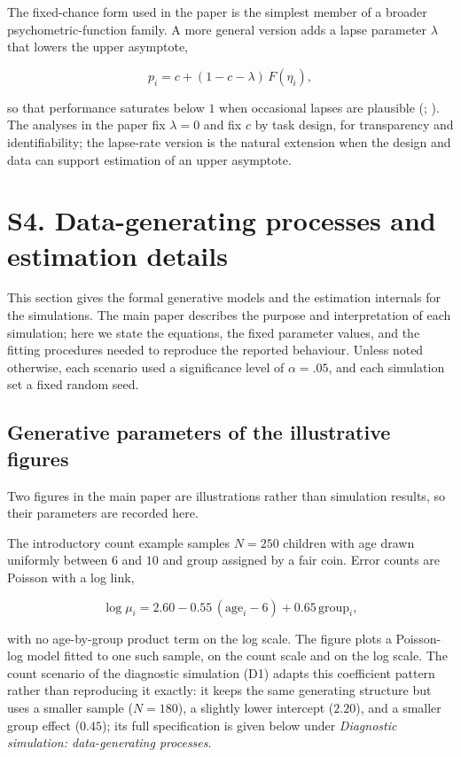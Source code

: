 \documentclass[
  man,
  floatsintext,
  longtable,
  nolmodern,
  notxfonts,
  notimes,
  colorlinks=true,linkcolor=blue,citecolor=blue,urlcolor=blue]{apa7}
\begin{document}
The fixed-chance form used in the paper is the simplest member of a
broader psychometric-function family. A more general version adds a
lapse parameter \(\lambda\) that lowers the upper asymptote,

\[
p_i = c + (1 - c - \lambda)\,F(\eta_i),
\]

so that performance saturates below \(1\) when occasional lapses are
plausible (;
). The analyses in
the paper fix \(\lambda = 0\) and fix \(c\) by task design, for
transparency and identifiability; the lapse-rate version is the natural
extension when the design and data can support estimation of an upper
asymptote.

\section{S4. Data-generating processes and estimation
details}\label{s4.-data-generating-processes-and-estimation-details}

This section gives the formal generative models and the estimation
internals for the simulations. The main paper describes the purpose and
interpretation of each simulation; here we state the equations, the
fixed parameter values, and the fitting procedures needed to reproduce
the reported behaviour. Unless noted otherwise, each scenario used a
significance level of \(\alpha = .05\), and each simulation set a fixed
random seed.

\subsection{Generative parameters of the illustrative
figures}\label{generative-parameters-of-the-illustrative-figures}

Two figures in the main paper are illustrations rather than simulation
results, so their parameters are recorded here.

The introductory count example samples \(N = 250\) children with age
drawn uniformly between \(6\) and \(10\) and group assigned by a fair
coin. Error counts are Poisson with a log link,

\[
\log \mu_i = 2.60 - 0.55\,(\text{age}_i - 6) + 0.65\,\text{group}_i,
\]

with no age-by-group product term on the log scale. The figure plots a
Poisson-log model fitted to one such sample, on the count scale and on
the log scale. The count scenario of the diagnostic simulation (D1)
adapts this coefficient pattern rather than reproducing it exactly: it
keeps the same generating structure but uses a smaller sample
(\(N = 180\)), a slightly lower intercept (\(2.20\)), and a smaller
group effect (\(0.45\)); its full specification is given below under
\emph{Diagnostic simulation: data-generating processes}.
\end{document}
